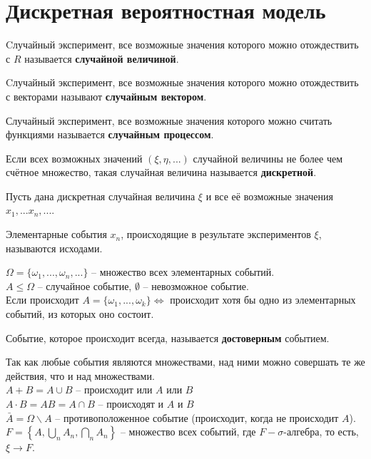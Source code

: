 \section{Дискретная вероятностная модель}
\begin{definition}
Cлучайный эксперимент, все возможные значения которого можно отождествить с $R$ называется \textbf{случайной величиной}.
\end{definition}
\begin{definition}
Cлучайный эксперимент, все возможные значения которого можно отождествить с векторами называют \textbf{случайным вектором}.
\end{definition}
\begin{definition}
Случайный эксперимент, все возможные значения которого можно считать функциями называется \textbf{случайным процессом}.
\end{definition}
\begin{definition}
Если всех возможных значений $(\xi, \eta, ...)$ случайной величины не более чем счётное множество, такая случайная величина называется \textbf{дискретной}.
\end{definition}
Пусть дана дискретная случайная величина $\xi$  и все её возможные значения $x_1,...x_n,...$.
\begin{definition}
Элементарные события $x_n$, происходящие в результате экспериментов $\xi$, называются исходами.
\end{definition}
$\Omega = \{\omega_1,...,\omega_n,...\}$ -- множество всех элементарных событий.\\
$A\leq\Omega$ -- случайное событие, $\emptyset$ -- невозможное событие.\\
Если происходит $A=\{\omega_1,...,\omega_k\}\Leftrightarrow$ происходит хотя бы одно из элементарных событий, из которых оно состоит.\\
\begin{definition}
Событие, которое происходит всегда, называется \textbf{достоверным} событием.
\end{definition}
Так как любые события являются множествами, над ними можно совершать те же действия, что и над множествами. \\
$A+B=A\cup B$ -- происходит или $A$ или $B$\\
$A\cdot B = AB = A\cap B$ -- происходят и $A$ и $B$\\
$\bar{A} = \Omega\backslash A$ -- противоположенное событие (происходит, когда не происходит $A$).\\
$F=\left\{A, \bigcup\limits_n A_n, \bigcap\limits_n A_n\right\}$ -- множество всех событий, где $F - \sigma$-алгебра, то есть, $\xi\rightarrow F$.
